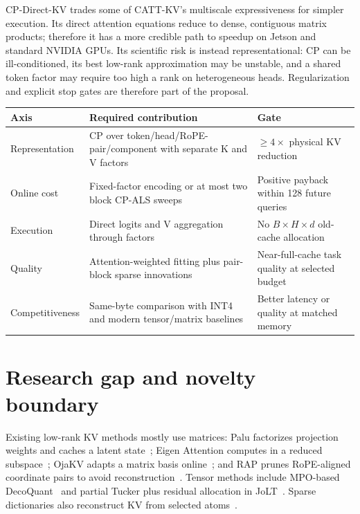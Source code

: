 \documentclass[11pt]{article}
\begin{document}
CP-Direct-KV trades some of CATT-KV's multiscale expressiveness for simpler execution. Its direct
attention equations reduce to dense, contiguous matrix products; therefore it has a more credible
path to speedup on Jetson and standard NVIDIA GPUs. Its scientific risk is instead representational:
CP can be ill-conditioned, its best low-rank approximation may be unstable, and a shared token
factor may require too high a rank on heterogeneous heads. Regularization and explicit stop gates
are therefore part of the proposal.

\begin{center}
\small
\renewcommand{\arraystretch}{1.22}
\begin{tabularx}{.98\textwidth}{@{}p{2.55cm}X p{2.2cm}@{}}
\toprule
\textbf{Axis} & \textbf{Required contribution} & \textbf{Gate} \\
\midrule
Representation & CP over token/head/RoPE-pair/component with separate K and V factors & $\ge 4\times$ physical KV reduction \\
Online cost & Fixed-factor encoding or at most two block CP-ALS sweeps & Positive payback within 128 future queries \\
Execution & Direct logits and V aggregation through factors & No $B\times H\times d$ old-cache allocation \\
Quality & Attention-weighted fitting plus pair-block sparse innovations & Near-full-cache task quality at selected budget \\
Competitiveness & Same-byte comparison with INT4 and modern tensor/matrix baselines & Better latency or quality at matched memory \\
\bottomrule
\end{tabularx}
\end{center}

\section{Research gap and novelty boundary}

Existing low-rank KV methods mostly use matrices: Palu factorizes projection weights and caches a
latent state~\cite{palu}; Eigen Attention computes in a reduced subspace~\cite{eigen}; OjaKV adapts
a matrix basis online~\cite{ojakv}; and RAP prunes RoPE-aligned coordinate pairs to avoid
reconstruction~\cite{rap}. Tensor methods include MPO-based DecoQuant~\cite{decoquant} and partial
Tucker plus residual allocation in JoLT~\cite{jolt}. Sparse dictionaries also reconstruct KV from
selected atoms~\cite{lexico}.
\end{document}
